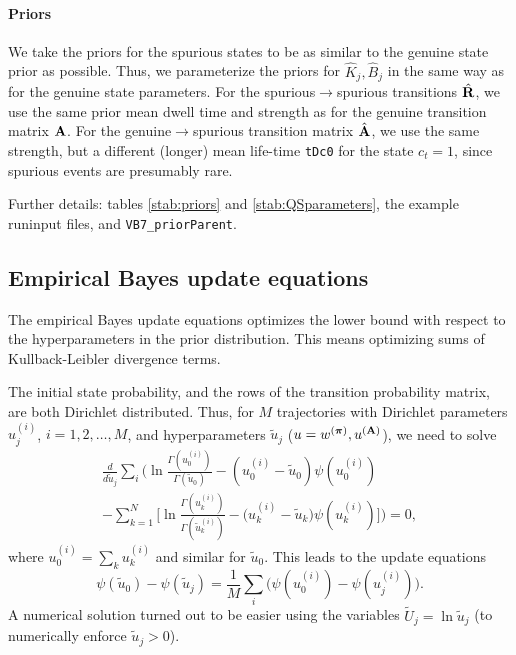 \paragraph{Priors} We take the priors for the spurious states to be as
similar to the genuine state prior as possible. Thus, we parameterize
the priors for $\hat K_j,\hat B_j$ in the same way as for the genuine
state parameters. For the spurious$\to$spurious transitions
$\hat{\mathbf{R}}$, we use the same prior mean dwell time and strength
as for the genuine transition matrix $\mathbf{A}$. For the
genuine$\to$spurious transition matrix $\hat{\mathbf{A}}$, we use the
same strength, but a different (longer) mean life-time \verb+tDc0+ for the state
$c_t=1$, since spurious events are presumably rare. 

Further details: tables \ref{stab:priors} and \ref{stab:QSparameters},
the example runinput files, and \verb+VB7_priorParent+.

\subsection{Empirical Bayes update equations}
The empirical Bayes update equations optimizes the lower bound with
respect to the hyperparameters in the prior distribution. This means
optimizing sums of Kullback-Leibler divergence terms. 

The initial state probability, and the rows of the transition
probability matrix, are both Dirichlet distributed. Thus, for $M$
trajectories with Dirichlet parameters $u_j^{(i)}$, $i=1,2,\ldots,M$,
and hyperparameters $\tilde{u}_j$ ($u = w^{(\boldsymbol{\pi})},u^{(\mathbf{A})}$),
we need to solve
\begin{multline}
\frac{d}{d \tilde u_j} \sum_i\Bigg( 
 \ln\frac{\Gamma(u_0^{(i)})}{\Gamma(\tilde u_0)}
    -(u_0^{(i)}-\tilde u_0)\psi(u_0^{(i)})\\
    -\sum_{k=1}^N\bigg[
      \ln\frac{\Gamma(u_k^{(i)})}{\Gamma(\tilde u_k^{(i)})}
      -\big(u_k^{(i)}-\tilde u_k\big)
      \psi(u_k^{(i)})\bigg]\Bigg)=0,
\end{multline}
where $u_0^{(i)}=\sum_ku_k^{(i)}$ and similar for $\tilde u_0$. This
leads to the update equations
\begin{equation}
  \psi(\tilde u_0)-\psi(\tilde u_j)
=\frac{1}{M}\sum_i\bigg(
  \psi(u_0^{(i)})-\psi(u_j^{(i)})\bigg).
\end{equation}
A numerical solution turned out to be easier using the variables
$\tilde U_j=\ln \tilde u_j$ (to numerically enforce $\tilde u_j>0$).

